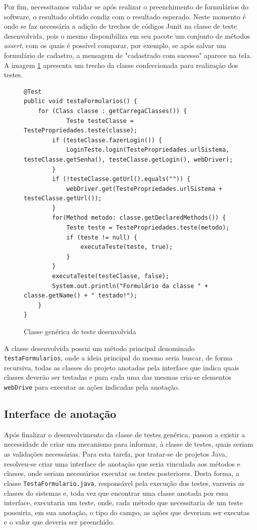\documentclass[tg]{mdtufsm}
\begin{document}
Por fim, necessitamos validar se após realizar o preenchimento de formulários do software, o resultado obtido condiz com o resultado esperado. Neste momento é onde se faz necessária a adição de trechos de códigos Junit na classe de teste
desenvolvida, pois o mesmo disponibiliza em seu pacote um conjunto de métodos \emph{assert}, com os quais é possível comparar, por exemplo, se após salvar um formulário de cadastro, a mensagem de "cadastrado com sucesso" aparece na tela.
A imagem \ref{code:TestaFormularios.java} apresenta um trecho da classe confeccionada para realização dos testes.

\begin{figure}[!htb]
\begin{lstlisting}
@Test
public void testaFormularios() {
	for (Class classe : getCarregaClasses()) {
    		Teste testeClasse = TestePropriedades.teste(classe);
        if (testeClasse.fazerLogin()) {
            LoginTeste.login(TestePropriedades.urlSistema, testeClasse.getSenha(), testeClasse.getLogin(), webDriver);
        }
        if (!testeClasse.getUrl().equals("")) {
            webDriver.get(TestePropriedades.urlSistema + testeClasse.getUrl());
        }
        for(Method metodo: classe.getDeclaredMethods()) {
            Teste teste = TestePropriedades.teste(metodo);
            if (teste != null) {
                executaTeste(teste, true);
            }
        }
        executaTeste(testeClasse, false);
        System.out.println("Formulário da classe " + classe.getName() + " testado!");
	}
}
\end{lstlisting}
    \caption{Classe genérica de teste desenvolvida}
	\label{code:TestaFormularios.java}
\end{figure}

A classe desenvolvida possui um método principal denominado \texttt{testaFormularios}, onde a ideia principal do mesmo seria buscar,
de forma recursiva, todas as classes do projeto anotadas pela interface que indica quais classes deverão ser testadas e para cada uma das mesmas cria-se elementos \texttt{webDrive} para executar as ações indicadas pela anotação.

\subsection{Interface de anotação}

Após finalizar o desenvolvimento da classe de testes genérica, passou a existir a necessidade de criar um mecanismo para informar, à classe de testes, quais seriam as validações necessárias. Para esta tarefa,
por tratar-se de projetos Java, resolveu-se criar uma interface de anotação que seria vinculada aos métodos e classes, onde seriam necessários executar os testes posteriores. Desta forma, a classe \texttt{TestaFormulario.java},
responsável pela execução dos testes, varreria as classes do sistemas e, toda vez que encontrar uma classe anotada por essa interface, executaria um teste, onde, cada método que necessitaria de um teste possuiria, em sua anotação, o tipo do campo,
as ações que deveriam ser executas e o valor que deveria ser preenchido.
\end{document}
